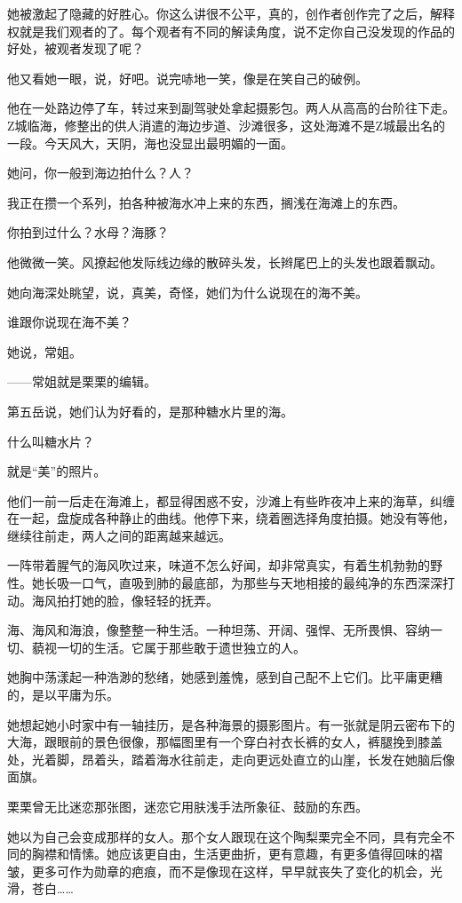 \documentclass[lang=cn,newtx,12pt,scheme=chinese]{elegantbook}
\begin{document}
她被激起了隐藏的好胜心。你这么讲很不公平，真的，创作者创作完了之后，解释权就是我们观者的了。每个观者有不同的解读角度，说不定你自己没发现的作品的好处，被观者发现了呢？

他又看她一眼，说，好吧。说完哧地一笑，像是在笑自己的破例。

他在一处路边停了车，转过来到副驾驶处拿起摄影包。两人从高高的台阶往下走。Z城临海，修整出的供人消遣的海边步道、沙滩很多，这处海滩不是Z城最出名的一段。今天风大，天阴，海也没显出最明媚的一面。

她问，你一般到海边拍什么？人？

我正在攒一个系列，拍各种被海水冲上来的东西，搁浅在海滩上的东西。

你拍到过什么？水母？海豚？

他微微一笑。风撩起他发际线边缘的散碎头发，长辫尾巴上的头发也跟着飘动。

她向海深处眺望，说，真美，奇怪，她们为什么说现在的海不美。

谁跟你说现在海不美？

她说，常姐。

——常姐就是栗栗的编辑。

第五岳说，她们认为好看的，是那种糖水片里的海。

什么叫糖水片？

就是“美”的照片。

他们一前一后走在海滩上，都显得困惑不安，沙滩上有些昨夜冲上来的海草，纠缠在一起，盘旋成各种静止的曲线。他停下来，绕着圈选择角度拍摄。她没有等他，继续往前走，两人之间的距离越来越远。

一阵带着腥气的海风吹过来，味道不怎么好闻，却非常真实，有着生机勃勃的野性。她长吸一口气，直吸到肺的最底部，为那些与天地相接的最纯净的东西深深打动。海风拍打她的脸，像轻轻的抚弄。

海、海风和海浪，像整整一种生活。一种坦荡、开阔、强悍、无所畏惧、容纳一切、藐视一切的生活。它属于那些敢于遗世独立的人。

她胸中荡漾起一种浩渺的愁绪，她感到羞愧，感到自己配不上它们。比平庸更糟的，是以平庸为乐。

她想起她小时家中有一轴挂历，是各种海景的摄影图片。有一张就是阴云密布下的大海，跟眼前的景色很像，那幅图里有一个穿白衬衣长裤的女人，裤腿挽到膝盖处，光着脚，昂着头，踏着海水往前走，走向更远处直立的山崖，长发在她脑后像面旗。

栗栗曾无比迷恋那张图，迷恋它用肤浅手法所象征、鼓励的东西。

她以为自己会变成那样的女人。那个女人跟现在这个陶梨栗完全不同，具有完全不同的胸襟和情愫。她应该更自由，生活更曲折，更有意趣，有更多值得回味的褶皱，更多可作为勋章的疤痕，而不是像现在这样，早早就丧失了变化的机会，光滑，苍白……
\end{document}
